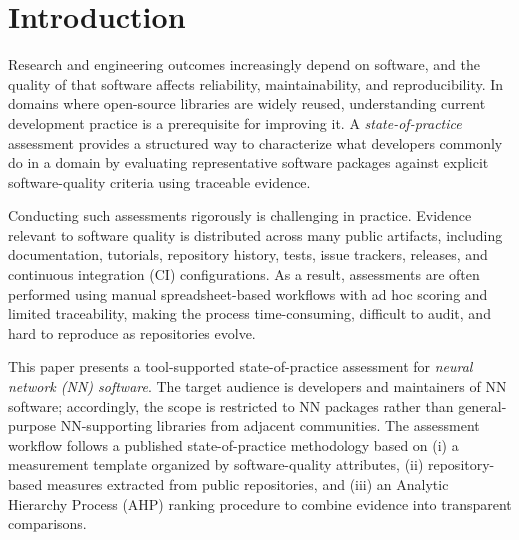\documentclass[final,1p,times,authoryear,12pt]{elsarticle}
\providecommand{\wss}[1]{\textcolor{blue}{\textit{#1}}}
\begin{document}
\section{Introduction}\label{introduction}




Research and engineering outcomes increasingly depend on software, and the quality of that software affects reliability,
 maintainability, and reproducibility. In domains where open-source libraries are widely reused,
  understanding current development practice is a prerequisite for improving it. A \emph{state-of-practice} assessment provides
   a structured way to characterize what developers commonly do in a domain by evaluating representative software packages against 
   explicit software-quality criteria using traceable evidence.

Conducting such assessments rigorously is challenging in practice. Evidence relevant to software quality is distributed across many 
public artifacts, including documentation, tutorials, repository history, tests, issue trackers, releases, and continuous integration 
(CI) configurations. As a result, assessments are often performed using manual spreadsheet-based workflows with ad hoc scoring 
and limited traceability, making the process time-consuming, difficult to audit, and hard to reproduce as repositories evolve.

This paper presents a tool-supported state-of-practice assessment for \emph{neural network (NN) software}. 
The target audience is developers and maintainers of NN software; accordingly, the scope is restricted to NN packages rather than 
general-purpose NN-supporting libraries from adjacent communities. The assessment workflow follows a published state-of-practice 
methodology based on (i) a measurement template organized by software-quality attributes, (ii) repository-based measures extracted 
from public repositories, and (iii) an Analytic Hierarchy Process (AHP) ranking procedure to combine evidence into transparent 
comparisons.
\end{document}
